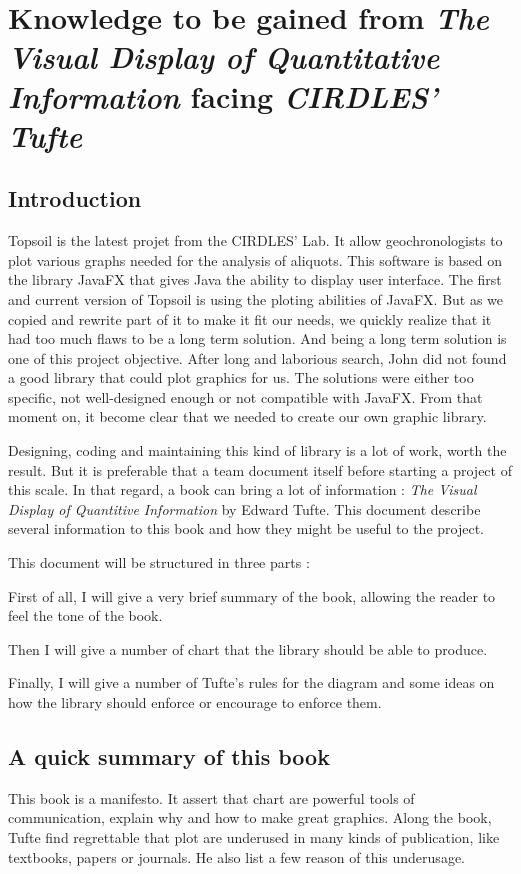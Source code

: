 \chapter{Knowledge to be gained from \textit{The Visual Display of Quantitative Information} facing \textit{CIRDLES' Tufte}}

\section{Introduction}
Topsoil is the latest projet from the CIRDLES' Lab. It allow geochronologists to plot various graphs needed for the analysis of aliquots. This software is based on the library JavaFX that gives Java the ability to display user interface.
The first and current version of Topsoil is using the ploting abilities of JavaFX. But as we copied and rewrite part of it to make it fit our needs, we quickly realize that it had too much flaws to be a long term solution. And being a long term solution is one of this project objective.
After long and laborious search, John did not found a good library that could plot graphics for us. The solutions were either too specific, not well-designed enough or not compatible with JavaFX. From that moment on, it become clear that we needed to create our own graphic library. 

Designing, coding and maintaining this kind of library is a lot of work, worth the result. But it is preferable that a team document itself before starting a project of this scale. 
In that regard, a book can bring a lot of information : \textit{The Visual Display of Quantitive Information} by Edward Tufte. This document describe several information to this book and how they might be useful to the project. %

This document will be structured in three parts : 
\begin{enum}
\item First of all, I will give a very brief summary of the book, allowing the reader to feel the tone of the book.
\item Then I will give a number of chart that the library should be able to produce.
\item Finally, I will give a number of Tufte's rules for the diagram and some ideas on how the library should enforce or encourage to enforce them. 
\end{enum}
\section{A quick summary of this book}
This book is a manifesto. It assert that chart are powerful tools of communication, explain why and how to make great graphics.
Along the book, Tufte find regrettable that plot are underused in many kinds of publication, like textbooks, papers or journals. He also list a few reason of this underusage.

